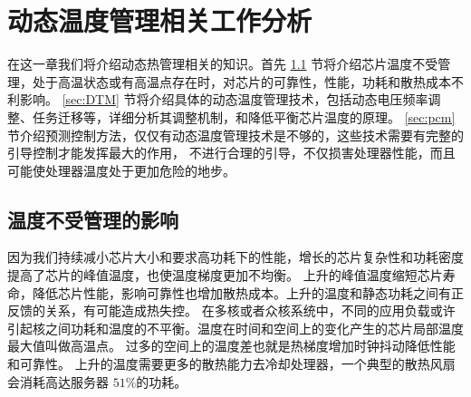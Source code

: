 
\chapter{动态温度管理相关工作分析}



在这一章我们将介绍动态热管理相关的知识。首先 \ref{sec:adverse} 节将介绍芯片温度不受管理，处于高温状态或有高温点存在时，对芯片的可靠性，性能，功耗和散热成本不利影响。
 \ref{sec:DTM} 节将介绍具体的动态温度管理技术，包括动态电压频率调整、任务迁移等，详细分析其调整机制，和降低平衡芯片温度的原理。
 \ref{sec:pcm} 节介绍预测控制方法，仅仅有动态温度管理技术是不够的，这些技术需要有完整的引导控制才能发挥最大的作用，
 不进行合理的引导，不仅损害处理器性能，而且可能使处理器温度处于更加危险的地步。



\section{温度不受管理的影响}\label{sec:adverse}

因为我们持续减小芯片大小和要求高功耗下的性能，增长的芯片复杂性和功耗密度提高了芯片的峰值温度，也使温度梯度更加不均衡。
上升的峰值温度缩短芯片寿命，降低芯片性能，影响可靠性也增加散热成本\cite{skadron:TACO'04}。上升的温度和静态功耗之间有正反馈的关系，有可能造成热失控。
在多核或者众核系统中，不同的应用负载或许引起核之间功耗和温度的不平衡。温度在时间和空间上的变化产生的芯片局部温度最大值叫做高温点\cite{Donald:ISCA'06}。
过多的空间上的温度差也就是热梯度增加时钟抖动降低性能和可靠性。
上升的温度需要更多的散热能力去冷却处理器，一个典型的散热风扇会消耗高达服务器 $51\%$的功耗\cite{lefurgy2003energy}\cite{ayoub2010gentlecool}。

